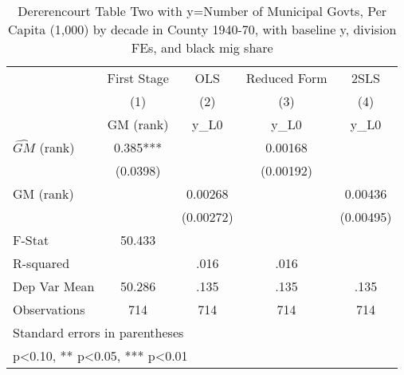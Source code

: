 \begin{table}[htbp]\centering
\def\sym#1{\ifmmode^{#1}\else\(^{#1}\)\fi}
\caption{Dererencourt Table Two with y=Number of Municipal Govts, Per Capita (1,000) by decade in County 1940-70, with baseline y, division FEs, and black mig share}
\begin{tabular}{l*{4}{c}}
\toprule
                    & First Stage   &         OLS   &Reduced Form   &        2SLS   \\
                    &\multicolumn{1}{c}{(1)}&\multicolumn{1}{c}{(2)}&\multicolumn{1}{c}{(3)}&\multicolumn{1}{c}{(4)}\\
                    &\multicolumn{1}{c}{GM  (rank)}&\multicolumn{1}{c}{y\_L0}&\multicolumn{1}{c}{y\_L0}&\multicolumn{1}{c}{y\_L0}\\
\midrule
$\hat{GM}$ (rank)   &       0.385***&               &     0.00168   &               \\
                    &    (0.0398)   &               &   (0.00192)   &               \\
\addlinespace
GM  (rank)          &               &     0.00268   &               &     0.00436   \\
                    &               &   (0.00272)   &               &   (0.00495)   \\
\midrule
F-Stat              &      50.433   &               &               &               \\
R-squared           &               &        .016   &        .016   &               \\
Dep Var Mean        &      50.286   &        .135   &        .135   &        .135   \\
Observations        &         714   &         714   &         714   &         714   \\
\bottomrule
\multicolumn{5}{l}{\footnotesize Standard errors in parentheses}\\
\multicolumn{5}{l}{\footnotesize * p<0.10, ** p<0.05, *** p<0.01}\\
\end{tabular}
\end{table}
